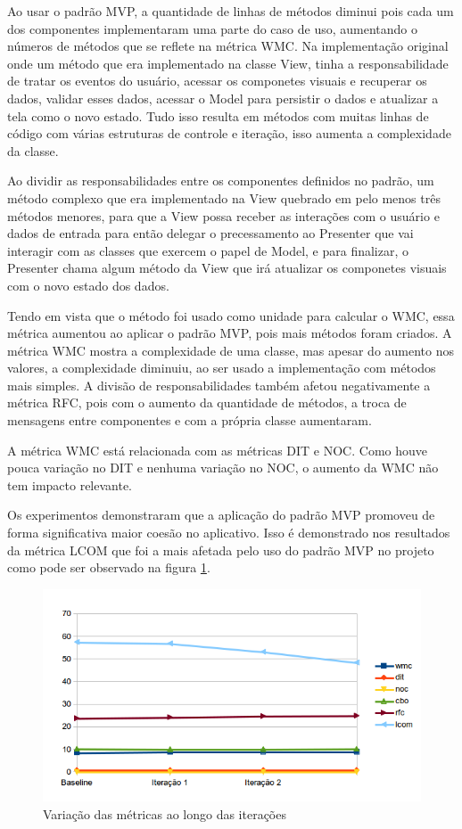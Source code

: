 \documentclass[conference]{IEEEtran}
\begin{document}
Ao usar o padrão MVP, a quantidade de linhas de métodos diminui pois cada um
dos componentes implementaram uma parte do caso de uso, aumentando o números de
métodos que se reflete na métrica WMC. Na implementação original onde um método
que era implementado na classe View, tinha a  responsabilidade de tratar os
eventos do usuário, acessar os componetes visuais e recuperar os dados, validar
esses dados, acessar o Model para persistir o dados e atualizar a tela como o
novo estado. Tudo isso resulta em métodos com muitas linhas de código com várias
estruturas de controle e iteração, isso aumenta a complexidade da classe.

Ao dividir as responsabilidades entre os componentes definidos no padrão, um
método complexo que era implementado na View quebrado em pelo menos três métodos
menores, para que a View possa receber as interações com o usuário e dados de
entrada para então delegar o precessamento ao Presenter que vai interagir com as
classes que exercem o papel de Model, e para finalizar, o Presenter chama algum
método da View que irá atualizar os componetes visuais com o novo estado dos
dados.

Tendo em vista que o método foi usado como unidade para calcular o WMC, essa
métrica aumentou ao aplicar o padrão MVP, pois mais métodos foram criados. A
métrica WMC mostra a complexidade de uma classe, mas apesar do aumento nos
valores, a complexidade diminuiu, ao ser usado a implementação com métodos mais
simples.
A divisão de responsabilidades também afetou negativamente a métrica RFC, pois
com o aumento da quantidade de métodos, a troca de mensagens entre componentes
e com a própria classe aumentaram.  


A métrica WMC está relacionada com as métricas DIT e NOC. Como houve pouca
variação no DIT e nenhuma variação no NOC, o aumento da WMC não tem impacto
relevante.

Os experimentos demonstraram que a aplicação do padrão MVP promoveu de forma
significativa maior coesão no aplicativo. Isso é demonstrado nos resultados da
métrica LCOM que foi a mais afetada pelo uso do padrão MVP no projeto como pode
ser observado na figura \ref{fig:allmetrics}.

\begin{figure}[htb]
	\includegraphics[scale=0.6]{img/allmetrics}
	\caption{\label{fig:allmetrics} Variação das métricas ao longo das iterações}
\end{figure}
\end{document}
